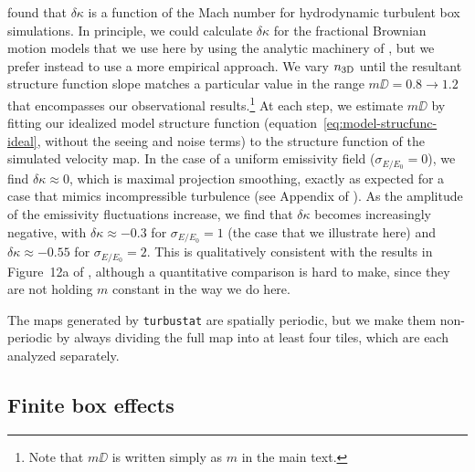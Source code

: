 \documentclass[fleqn,usenatbib, useAMS, a4paper]{mnras}
\newcommand\startNEW{\color{black}}
\newcommand\stopNEW{\color{black}}
\newcommand\shortsig[1]{\ensuremath{\sigma_{#1/#1_0}}}
\begin{document}
\citet{Brunt:2004a} found that \(\delta\kappa\) is a function of the Mach number for
hydrodynamic turbulent box simulations.  In principle,
we could calculate \(\delta\kappa\) for
the fractional Brownian motion models that we use here
by using the analytic machinery of \citet{Esquivel:2007b},
but we prefer instead to use a more empirical approach.
We vary \(n_{\mathrm{3D}}\) until the
resultant structure function slope matches a particular value in the
range \(m\DD = 0.8 \to 1.2\)
that encompasses our observational results.\footnote{%
  Note that \(m\DD\) is written simply as \(m\) in the main text.
}
At each step, we estimate \(m\DD\) by fitting our idealized model structure function
(equation~\eqref{eq:model-strucfunc-ideal}, without the seeing and noise terms)
to the structure function of the simulated velocity map.
In the case of a uniform emissivity field (\(\shortsig{E} = 0\)),
we find \(\delta\kappa \approx 0\),
which is maximal projection smoothing, exactly as expected for a case that
mimics incompressible turbulence (see Appendix of \citealt{Miville-Deschenes:2003a}).
As the amplitude of the emissivity fluctuations increase,
we find that \(\delta\kappa\) becomes increasingly negative,
with \(\delta\kappa \approx -0.3\) for \(\shortsig{E} = 1\) (the case that we illustrate here)
and \(\delta\kappa \approx -0.55\) for \(\shortsig{E} = 2\).
This is qualitatively consistent with the results in
Figure~12a of \citet{Brunt:2004a}, although a quantitative
comparison is hard to make, since they are not holding \(m\) constant
in the way we do here. 
\stopNEW

The maps generated by \texttt{turbustat} are spatially periodic,
but we make them non-periodic by always dividing the full map into at least
four tiles, which are each analyzed separately. 

\startNEW
\subsection{Finite box effects}
\label{sec:finite-box-effects}
\stopNEW
\end{document}

